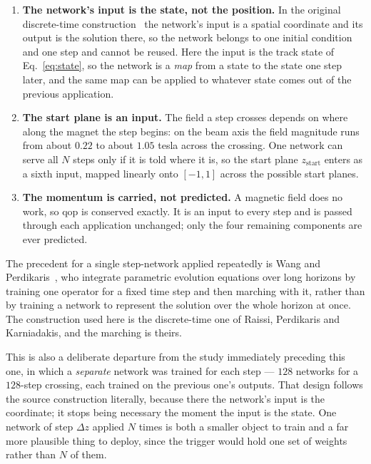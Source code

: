\documentclass[11pt,a4paper]{article}
\newcommand{\qop}{\ensuremath{\mathrm{qop}}}
\begin{document}
\begin{enumerate}
  \item \textbf{The network's input is the state, not the position.} In the
  original discrete-time construction~\citep[\S3]{raissi2019} the network's
  input is a spatial coordinate and its output is the solution there, so the
  network belongs to one initial condition and one step and cannot be reused.
  Here the input is the track state of Eq.~\eqref{eq:state}, so the network is
  a \emph{map} from a state to the state one step later, and the same map can
  be applied to whatever state comes out of the previous application.
  \item \textbf{The start plane is an input.} The field a step crosses depends
  on where along the magnet the step begins: on the beam axis the field
  magnitude runs from about $0.22$ to about $1.05$ tesla across the crossing.
  One network can serve all $N$ steps only if it is told where it is, so the
  start plane $z_{\mathrm{start}}$ enters as a sixth input, mapped linearly
  onto $[-1, 1]$ across the possible start planes.
  \item \textbf{The momentum is carried, not predicted.} A magnetic field does
  no work, so $\qop$ is conserved exactly. It is an input to every step and is
  passed through each application unchanged; only the four remaining components
  are ever predicted.
\end{enumerate}

The precedent for a single step-network applied repeatedly is Wang and
Perdikaris~\citep{wang2021longtime}, who integrate parametric evolution
equations over long horizons by training one operator for a fixed time step and
then marching with it, rather than by training a network to represent the
solution over the whole horizon at once. The construction used here is the
discrete-time one of Raissi, Perdikaris and Karniadakis, and the marching is
theirs.

This is also a deliberate departure from the study immediately preceding this
one, in which a \emph{separate} network was trained for each step --- $128$
networks for a $128$-step crossing, each trained on the previous one's outputs.
That design follows the source construction literally, because there the
network's input is the coordinate; it stops being necessary the moment the
input is the state. One network of step $\Delta z$ applied $N$ times is both a
smaller object to train and a far more plausible thing to deploy, since the
trigger would hold one set of weights rather than $N$ of them.
\end{document}
